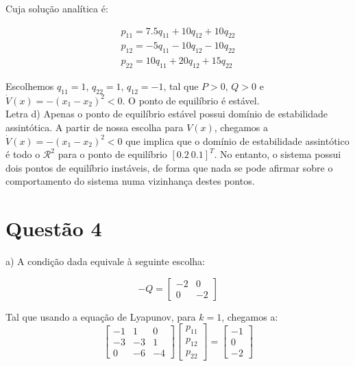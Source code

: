 Cuja solução analítica é:

\begin{equation}
\begin{array}{l}
p_{11}=7.5q_{11} + 10q_{12} + 10q_{22}\\
p_{12}=-5q_{11} - 10q_{12} - 10q_{22}\\
p_{22}= 10q_{11} +20q_{12} + 15q_{22}
\end{array}
\end{equation}

Escolhemos $q_{11} = 1$, $q_{22} = 1$, $q_{12} = -1$, tal que $P>0$, $Q>0$ e $\dot{V}(x) = -(x_1 - x_2)^2 <0$. O ponto de equilíbrio é estável.\\

Letra d) Apenas o ponto de equilíbrio estável possui domínio de estabilidade assintótica. A partir de nossa escolha para $V(x)$, chegamos a $\dot{V}(x) = -(x_1 - x_2)^2<0$ que implica que o domínio de estabilidade assintótico é todo o $\mathcal{R}^2$ para o ponto de equilíbrio $[0.2~0.1]^T$. No entanto, o sistema possui dois pontos de equilíbrio instáveis, de forma que nada se pode afirmar sobre o comportamento do sistema numa vizinhança destes pontos.\\

\section{Questão 4}

a) A condição dada equivale à seguinte escolha:

\[
-Q = \begin{bmatrix}
-2 & 0\\
0  & -2
\end{bmatrix}
\]

Tal que usando a equação de Lyapunov, para $k=1$, chegamos a:
\begin{equation}
\begin{bmatrix}
-1 & 1 & 0\\
-3 &-3 & 1\\
0  &-6 &-4
\end{bmatrix}
\begin{bmatrix}
p_{11}\\
p_{12}\\
p_{22}
\end{bmatrix}
=
\begin{bmatrix}
-1\\
 0\\
-2
\end{bmatrix}
\end{equation}

